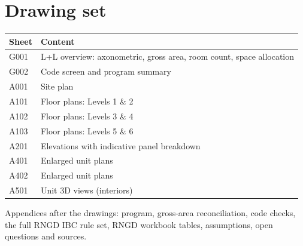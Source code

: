 \documentclass[10pt]{article}
\begin{document}
\section*{Drawing set}
\begin{tabular}{lp{12.5cm}}\toprule \textbf{Sheet} & \textbf{Content} \\ \midrule
G001 & L+L overview: axonometric, gross area, room count, space allocation \\
G002 & Code screen and program summary \\
A001 & Site plan \\
A101 & Floor plans: Levels 1 \& 2 \\
A102 & Floor plans: Levels 3 \& 4 \\
A103 & Floor plans: Levels 5 \& 6 \\
A201 & Elevations with indicative panel breakdown \\
A401 & Enlarged unit plans \\
A402 & Enlarged unit plans \\
A501 & Unit 3D views (interiors) \\
\bottomrule\end{tabular}

Appendices after the drawings: program, gross-area reconciliation, code checks, the full RNGD IBC rule set,
RNGD workbook tables, assumptions, open questions and sources.
\end{document}

